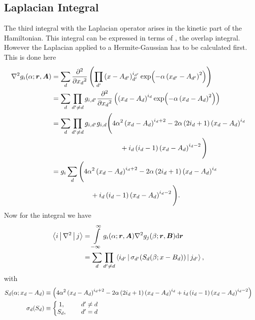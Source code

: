 \subsection{Laplacian Integral}
    The third integral with the Laplacian operator arises in the kinetic part
    of the Hamiltonian. This integral can be expressed in terms of
    , the overlap integral. However the Laplacian applied
    to a Hermite-Gaussian has to be calculated first. This is done here
        \begin{align}
            \nabla^2 g_i(\alpha;\blds{r},\blds{A}) &= \sum_d \prd{x_d}[][2]
            \left(\prod_{d'} \left(x - A_{d'}\right)^{i_{d'}}_{d'} \exp(-\alpha
            \left(x_{d'} - A_{d'}\right)^2)\right)\nonumber \\
            &= \sum_d \prod_{d'\neq d} g_{i,d'} \prd{x_d}[][2]\left(\left(x_d -
            A_d\right)^{i_d} \exp(-\alpha \left(x_d - A_d\right)^2)\right)
            \nonumber \\
            &= \sum_d \prod_{d'\neq d} g_{i,d'} g_{i,d}
            \Bigg(4\alpha^2\left(x_d-A_d\right)^{i_d+2} -
            2\alpha\left(2i_d+1\right)\left(x_d-A_d\right)^{i_d} \nonumber \\ 
            &\hspace{3.5cm}+
            i_d\left(i_d-1\right)\left(x_d-A_d\right)^{i_d-2}\Bigg) \nonumber
            \\
            &= g_i\sum_d \Bigg(4\alpha^2\left(x_d-A_d\right)^{i_d+2} -
            2\alpha\left(2i_d+1\right)\left(x_d-A_d\right)^{i_d} \nonumber \\
            &\hspace{2.0cm}+
            i_d\left(i_d-1\right)\left(x_d-A_d\right)^{i_d-2}\Bigg).
            \label{eq:laphermcalc}
        \end{align}
    Now for the integral we have
        \begin{align}
            \Braket{i|\nabla^2|j} &= \int\limits^{\infty}_{-\infty}
            g_i(\alpha;\boldsymbol{{r}},\boldsymbol{{A}})\nabla^2g_j(\beta;\boldsymbol{{r}},\boldsymbol{{B}}) 
            \mathrm{d}\boldsymbol{{r}} \nonumber \\
            &= \sum_d\prod_{d'\neq d}
            \Braket{i_{d'}|\sigma_{d'}(S_d(\beta;x-B_d))|j_{d'}},
            \label{eq:laplacianIntegral}
        \end{align}
    with
        \begin{equation}
            \begin{aligned}
                S_d(\alpha;x_d-A_d) &\equiv
                \left(4\alpha^2\left(x_d-A_d\right)^{i_d+2} -
                2\alpha\left(2i_d+1\right)\left(x_d-A_d\right)^{i_d} +
                i_d\left(i_d-1\right)\left(x_d-A_d\right)^{i_d-2}\right) \\
                \sigma_d(S_d) &\equiv \left\{\begin{matrix}
                                            1,&\indent d' \neq d \\
                                            S_d,&\indent d' = d
                                            \end{matrix}
                                        \right.
            \end{aligned}
        \end{equation}
